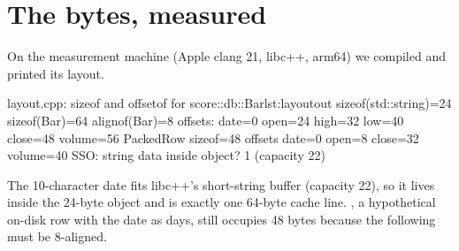 
\section{The bytes, measured}
On the measurement machine (Apple clang 21, libc++, arm64) we compiled  and printed its layout.

\begin{progout}{layout.cpp: sizeof and offsetof for score::db::Bar}{lst:layoutout}
sizeof(std::string)=24 sizeof(Bar)=64 alignof(Bar)=8
offsets: date=0 open=24 high=32 low=40 close=48 volume=56
PackedRow sizeof=48 offsets date=0 open=8 close=32 volume=40
SSO: string data inside object? 1 (capacity 22)
\end{progout}

The 10-character date fits libc++'s short-string buffer (capacity 22), so it lives inside the 24-byte 
object and  is exactly one 64-byte cache line. , a hypothetical on-disk row with the date as
 days, still occupies 48 bytes because the following  must be 8-aligned.

